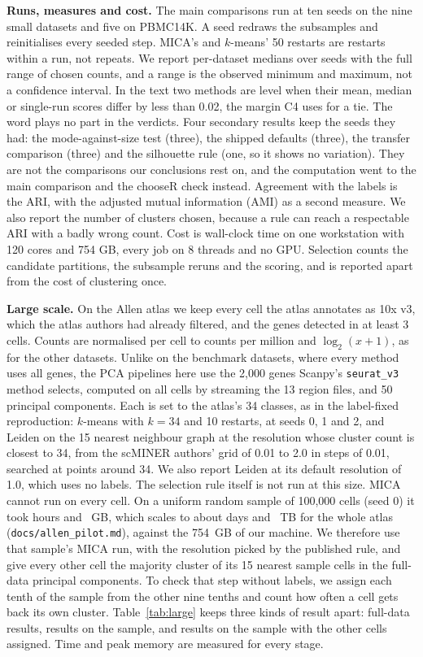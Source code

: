 \textbf{Runs, measures and cost.} The main comparisons run at ten seeds on the nine small datasets and
five on PBMC14K. A seed redraws the subsamples and reinitialises every seeded step. MICA's and
$k$-means' 50 restarts are restarts within a run, not repeats. We report per-dataset medians over seeds
with the full range of chosen counts, and a range is the observed minimum and maximum, not a confidence
interval. In the text two methods are level when their mean, median or single-run scores differ by less than 0.02, the
margin C4 uses for a tie. The word plays no part in the verdicts. Four secondary results keep the seeds they had: the mode-against-size test (three), the shipped defaults (three), the transfer comparison (three) and the silhouette rule (one, so it shows no variation). They are not the
comparisons our conclusions rest on, and the computation went to the main comparison and the chooseR
check instead. Agreement with the labels is the ARI, with the adjusted mutual information (AMI) as a
second measure. We also report the number of clusters chosen, because a rule can reach a respectable
ARI with a badly wrong count. Cost is wall-clock time on one workstation with 120 cores and 754 GB,
every job on 8 threads and no GPU. Selection counts the candidate partitions, the subsample reruns and
the scoring, and is reported apart from the cost of clustering once.

\textbf{Large scale.} On the Allen atlas we keep every cell the atlas annotates as 10x v3, which the
atlas authors had already filtered, and the genes detected in at least 3 cells. Counts are normalised per
cell to counts per million and $\log_2(x+1)$, as for the other datasets. Unlike on the benchmark datasets, where every
method uses all genes, the PCA pipelines here use the 2,000 genes Scanpy's \texttt{seurat\_v3} method selects, computed on all cells by streaming the 13 region
files, and 50 principal components. Each is set to the atlas's 34 classes, as in the label-fixed
reproduction: $k$-means with $k = 34$ and 10 restarts, at seeds 0, 1 and 2, and Leiden on the 15 nearest
neighbour graph at the resolution whose cluster count is closest to 34, from the scMINER authors' grid of
0.01 to 2.0 in steps of 0.01, searched at  points around 34. We also report Leiden at its default resolution of 1.0, which uses no labels. The
selection rule itself is not run at this size. MICA cannot run on every cell. On a uniform random
sample of 100,000 cells (seed 0) it took  hours and ~GB, which
scales to about  days and ~TB for the whole atlas
(\texttt{docs/allen\_pilot.md}), against the 754~GB of our machine. We therefore use that sample's MICA run,
with the resolution picked by the published rule, and give every other cell the majority cluster of its
15 nearest sample cells in the full-data principal components. To check that step without labels, we
assign each tenth of the sample from the other nine tenths and count how often a cell gets back its own
cluster. Table~\ref{tab:large} keeps three kinds of result apart: full-data results, results on the sample, and
results on the sample with the other cells assigned. Time and peak memory are measured for every stage.

